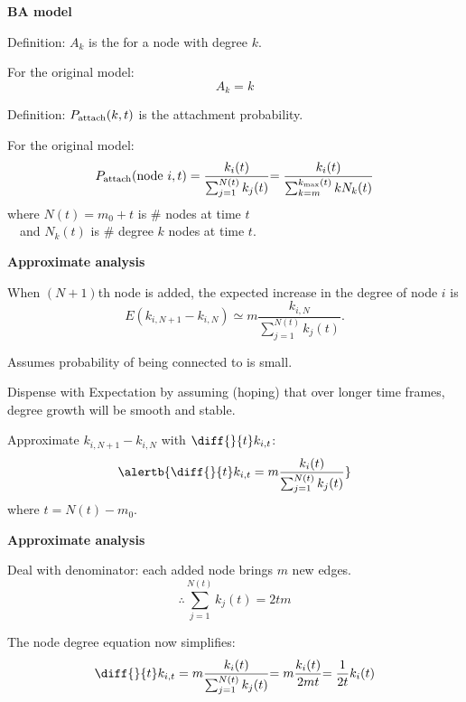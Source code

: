 \begin{frame}[label=]
\begin{frame}[label=]
\begin{frame}[label=]
\begin{frame}[label=]
\begin{frame}[label=]
 \textbf{BA model}  
 
 
 
   \alert{Definition:} $A_k$ is the 
   for a node with degree $k$.
 
     For the original model:
     $$ A_k = k$$
 
   \alert{Definition:} $P_{\textnormal{attach}}(k,t)$ 
   is the attachment probability.
 
     For the original model:
     $$
     P_{\textnormal{attach}}(\mbox{node $i$},t)
     =
     \frac{k_i(t)}
     {
     \sum_{j=1}^{N(t)} k_j(t)
     }
     {
       =
       \frac{k_i(t)}
       {
         \sum_{k=m}^{k_{\textnormal{max}}(t)} k N_k(t)
       }
     }
     $$
     {
       where $N(t) = m_0 + t$ is \# nodes at time $t$\\
     }
     {
       \ \ and $N_k(t)$ is \# degree $k$ nodes at time $t$.
     }
 


\begin{frame}[label=]
 \textbf{Approximate analysis}  

 
 
   When $(N+1)$th node is added, 
   the expected increase in the degree of node $i$ is 
   $$
   E(k_{i,N+1} - k_{i,N}) 
   \simeq 
   m
   \frac{k_{i,N}}
   {
     \sum_{j=1}^{N(t)} k_j(t)
   }.
   $$
 
   Assumes probability of being connected to is \alert{small}.
 
   Dispense with Expectation by assuming (hoping)
   that over longer time frames, degree growth will
   be smooth and stable.
 
   Approximate 
   $k_{i,N+1} - k_{i,N}$ with $\diff{}{t} k_{i,t}$:
   {
     $$
     \alertb{
       \diff{}{t} k_{i,t}
       =
       m
       \frac{k_{i}(t)}
       {
         \sum_{j=1}^{N(t)} k_j(t)
       }
     }
   $$
   where $t = N(t) - m_0$.
   }
 

\begin{frame}[label=]
 \textbf{Approximate analysis}  

 
 
   Deal with denominator: each added node brings $m$ new edges.
   $$
   {
     \therefore 
     \sum_{j=1}^{N(t)} k_j(t)
     =
     2 t m
   }
   $$
 
   The node degree equation now simplifies:
   $$
   \diff{}{t} k_{i,t}
   =
   m
   \frac{k_{i}(t)}
   {
     \sum_{j=1}^{N(t)} k_j(t)
   }
   {
     =
     m
     \frac{k_{i}(t)}
     {
       2 m t
     }
   }
   {
     =
     \frac{1}
     {
       2 t
     }
     k_{i}(t)
   }
   $$
 

\end{frame}
\end{frame}
\end{frame}
\end{frame}
\end{frame}
\end{frame}
\end{frame}

